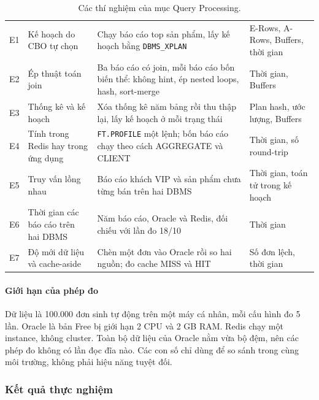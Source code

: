 \begin{table}[!htbp]
\centering
\caption{Các thí nghiệm của mục Query Processing.}\label{tab:q-experiments}
\reporttablesetup
\begin{tabularx}{\linewidth}{|c|P{3.6cm}|L|P{3cm}|}
\hline
{}
 &  &  &  \\ \hline
E1 & Kế hoạch do CBO tự chọn & Chạy báo cáo top sản phẩm, lấy kế hoạch bằng \texttt{DBMS\_XPLAN} & E-Rows, A-Rows, Buffers, thời gian \\ \hline
E2 & Ép thuật toán join & Ba báo cáo có join, mỗi báo cáo bốn biến thể: không hint, ép nested loops, hash, sort-merge & Thời gian, Buffers \\ \hline
E3 & Thống kê và kế hoạch & Xóa thống kê năm bảng rồi thu thập lại, lấy kế hoạch ở mỗi trạng thái & Plan hash, ước lượng, Buffers \\ \hline
E4 & Tính trong Redis hay trong ứng dụng & \texttt{FT.PROFILE} một lệnh; bốn báo cáo chạy theo cách AGGREGATE và CLIENT & Thời gian, số round-trip \\ \hline
E5 & Truy vấn lồng nhau & Báo cáo khách VIP và sản phẩm chưa từng bán trên hai DBMS & Thời gian, toán tử trong kế hoạch \\ \hline
E6 & Thời gian các báo cáo trên hai DBMS & Năm báo cáo, Oracle và Redis, đối chiếu với lần đo 18/10 & Thời gian \\ \hline
E7 & Độ mới dữ liệu và cache-aside & Chèn một đơn vào Oracle rồi so hai nguồn; đo cache MISS và HIT & Số đơn lệch, thời gian \\ \hline
\end{tabularx}
\end{table}

\paragraph{Giới hạn của phép đo}\label{sec:q-design-limits}

Dữ liệu là 100.000 đơn sinh tự động trên một máy cá nhân, mỗi cấu hình đo 5 lần. Oracle là bản Free bị giới hạn 2 CPU và 2 GB RAM. Redis chạy một instance, không cluster. Toàn bộ dữ liệu của Oracle nằm vừa bộ đệm, nên các phép đo không có lần đọc đĩa nào. Các con số chỉ dùng để so sánh trong cùng môi trường, không phải hiệu năng tuyệt đối.

\subsubsection{Kết quả thực nghiệm}\label{sec:q-results}

